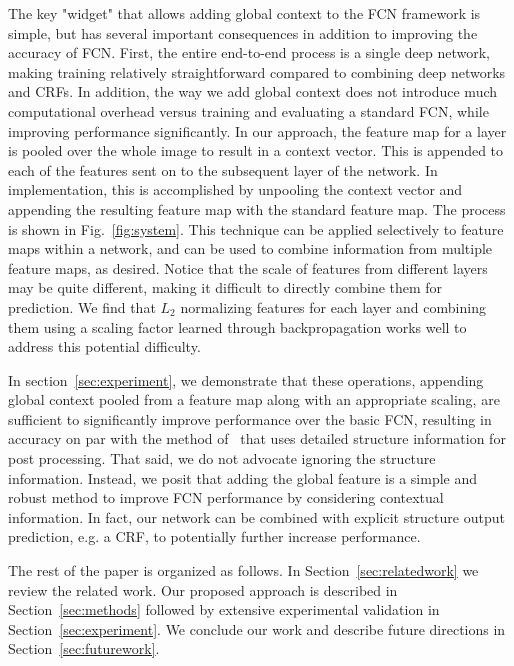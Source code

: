\documentclass{article} %
\begin{document}
The key "widget" that allows adding global context to the FCN framework is simple, but has several important consequences in addition to improving the accuracy of FCN. First, the entire end-to-end process is a single deep network, making training relatively straightforward compared to combining deep networks and CRFs. In addition, the way we add global context does not introduce much computational overhead versus training and evaluating a standard FCN, while improving performance significantly. In our approach, the feature map for a layer is pooled over the whole image to result in a context vector. This is appended to each of the features sent on to the subsequent layer of the network. In implementation, this is accomplished by unpooling the context vector and appending the resulting feature map with the standard feature map. The process is shown in Fig.~\ref{fig:system}. This technique can be applied selectively to feature maps within a network, and can be used to combine information from multiple feature maps, as desired. Notice that the scale of features from different layers may be quite different, making it difficult to directly combine them for prediction. We find that $L_2$ normalizing features for each layer and combining them using a scaling factor learned through backpropagation works well to address this potential difficulty. 

In section~\ref{sec:experiment}, we demonstrate that these operations, appending global context pooled from a feature map along with an appropriate scaling, are sufficient to significantly improve performance over the basic FCN, resulting in accuracy on par with the method of~\cite{chen2014semantic} that uses detailed structure information for post processing. That said, we do not advocate ignoring the structure information. Instead, we posit that adding the global feature is a simple and robust method to improve FCN performance by considering contextual information. In fact, our network can be combined with explicit structure output prediction, e.g. a CRF, to potentially further increase performance.

The rest of the paper is organized as follows. In Section~\ref{sec:relatedwork} we review the related work. Our proposed approach is described in Section~\ref{sec:methods} followed by extensive experimental validation in Section~\ref{sec:experiment}. We conclude our work and describe future directions in Section~\ref{sec:futurework}.

\end{document}

